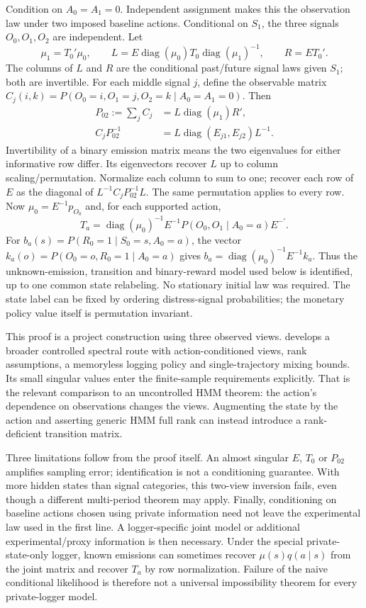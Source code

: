 Condition on $A_0=A_1=0$. Independent assignment makes this the observation
law under two imposed baseline actions. Conditional on $S_1$, the three
signals $O_0,O_1,O_2$ are independent. Let
\[
 \mu_1=T_0'\mu_0,\qquad
 L=E\operatorname{diag}(\mu_0)T_0\operatorname{diag}(\mu_1)^{-1},
 \qquad R=ET_0'.
\]
The columns of $L$ and $R$ are the conditional past/future signal laws
given $S_1$; both are invertible. For each middle signal $j$, define the
observable matrix $C_j(i,k)=P(O_0=i,O_1=j,O_2=k\mid A_0=A_1=0)$.
Then
\begin{align}
 P_{02}:=\sum_jC_j&=L\operatorname{diag}(\mu_1)R',\nonumber\\
 C_jP_{02}^{-1}&=L\operatorname{diag}(E_{j1},E_{j2})L^{-1}.
 \label{s4:controlled-spectral}
\end{align}
Invertibility of a binary emission matrix means the two eigenvalues for
either informative row differ. Its eigenvectors recover $L$ up to
column scaling/permutation. Normalize each column to sum to one; recover
each row of $E$ as the diagonal of $L^{-1}C_jP_{02}^{-1}L$.
The same permutation applies to every row. Now
$\mu_0=E^{-1}p_{O_0}$ and, for each supported action,
\begin{equation}
 T_a=\operatorname{diag}(\mu_0)^{-1}E^{-1}
 P(O_0,O_1\mid A_0=a)E^{-\prime}.
 \label{s4:unknown-transition-recovery}
\end{equation}
For $b_a(s)=P(R_0=1\mid S_0=s,A_0=a)$, the vector
$k_a(o)=P(O_0=o,R_0=1\mid A_0=a)$ gives
$b_a=\operatorname{diag}(\mu_0)^{-1}E^{-1}k_a$.
Thus the unknown-emission, transition and binary-reward model used below
is identified, up to one common state relabeling. No stationary initial
law was required. The state label can be fixed by ordering distress-signal
probabilities; the monetary policy value itself is permutation invariant.

This proof is a project construction using three observed views.
\citet[Sections 3.1--3.2]{spectral2016} develops a broader controlled
spectral route with action-conditioned views, rank assumptions, a
memoryless logging policy and single-trajectory mixing bounds. Its small
singular values enter the finite-sample requirements explicitly. That is
the relevant comparison to an uncontrolled HMM theorem: the action's
dependence on observations changes the views. Augmenting the state by
the action and asserting generic HMM full rank can instead introduce a
rank-deficient transition matrix.

Three limitations follow from the proof itself. An almost singular $E$,
$T_0$ or $P_{02}$ amplifies sampling error; identification is not a
conditioning guarantee. With more hidden states than signal categories,
this two-view inversion fails, even though a different multi-period theorem
may apply. Finally, conditioning on baseline actions chosen using private
information need not leave the experimental law used in the first line.
A logger-specific joint model or additional experimental/proxy information
is then necessary. Under the special private-state-only logger, known
emissions can sometimes recover $\mu(s)q(a\mid s)$ from the joint matrix
and recover $T_a$ by row normalization. Failure of the naive conditional
likelihood is therefore not a universal impossibility theorem for every
private-logger model.

